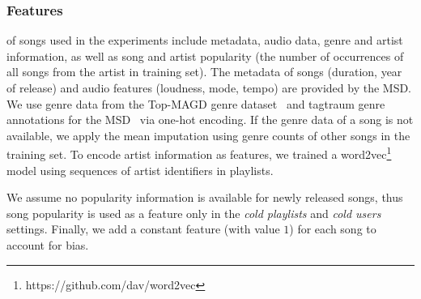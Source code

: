\subsubsection{Features}
of songs used in the experiments include metadata, audio data, genre and artist information, as well as song and 
artist popularity (\ie the number of occurrences of all songs from the artist in training set).
%
The metadata of songs (\eg duration, year of release) and audio features (\eg loudness, mode, tempo) are provided by the MSD.
We use genre data from the Top-MAGD genre dataset~\cite{schindler2012facilitating}
and tagtraum genre annotations for the MSD~\cite{schreiber2015improving} via one-hot encoding.
If the genre data of a song is not available, we apply the mean imputation using genre counts of other songs in the training set.
To encode artist information as features,
we trained a word2vec\footnote{https://github.com/dav/word2vec} model using sequences of artist identifiers in playlists.

We assume no popularity information is available for newly released songs,
thus song popularity is used as a feature only in the \emph{cold playlists} and \emph{cold users} settings.
Finally, we add a constant feature (with value $1$) for each song to account for bias.






